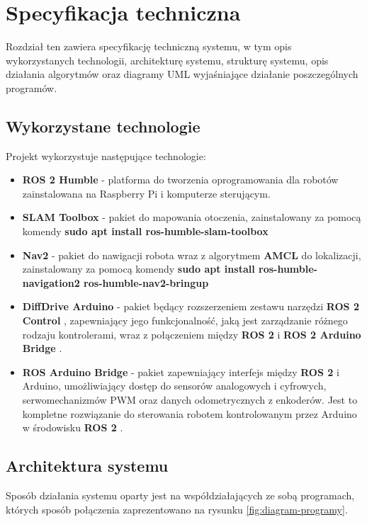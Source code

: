 \documentclass[a4paper,twoside,12pt]{book}
\begin{document}
\chapter{Specyfikacja techniczna}
\label{ch:05}
Rozdział ten zawiera specyfikację techniczną systemu, w tym opis wykorzystanych technologii, architekturę systemu, 
strukturę systemu, opis działania algorytmów oraz diagramy UML wyjaśniające działanie poszczególnych programów.
\section{Wykorzystane technologie} 
Projekt wykorzystuje następujące technologie:
\begin{itemize}
	\item  \textbf{ROS 2 Humble} - platforma do tworzenia oprogramowania dla robotów zainstalowana na Raspberry Pi i komputerze sterującym.
	\item  \textbf{SLAM Toolbox} - pakiet do mapowania otoczenia, zainstalowany za pomocą komendy \textbf{sudo apt install ros-humble-slam-toolbox}
	\item  \textbf{Nav2} - pakiet do nawigacji robota wraz z algorytmem \textbf{AMCL} do lokalizacji, zainstalowany za pomocą komendy \textbf{sudo apt install ros-humble-navigation2 ros-humble-nav2-bringup}
	\item   \textbf{DiffDrive Arduino} - pakiet będący rozszerzeniem zestawu narzędzi \textbf{ROS 2  Control} , zapewniający jego funkcjonalność, jaką jest zarządzanie różnego rodzaju kontrolerami, wraz z połączeniem między \textbf{ROS 2} i \textbf{ROS 2 Arduino Bridge} \cite{bib:diffdrive}. 
	\item  \textbf{ROS Arduino Bridge} - pakiet zapewniający interfejs między \textbf{ROS 2} i Arduino, umożliwiający dostęp do sensorów analogowych i cyfrowych, serwomechanizmów PWM oraz danych odometrycznych z enkoderów. Jest to kompletne rozwiązanie do sterowania robotem kontrolowanym przez Arduino w środowisku \textbf{ROS 2} \cite{bib:rosarduinobridge}.
\end{itemize}
\newpage
\section{Architektura systemu}
Sposób działania systemu oparty jest na współdziałających ze sobą programach, których sposób połączenia zaprezentowano na rysunku \ref{fig:diagram-programy}.
\end{document}
